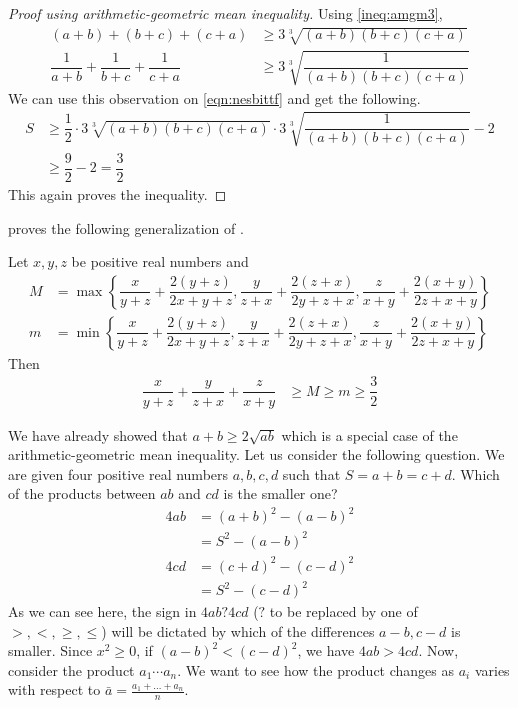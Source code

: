 \documentclass{subfile}
\begin{document}
		\begin{proof}[\itshape Proof using arithmetic-geometric mean inequality]
			Using \ref{ineq:amgm3},
				\begin{align*}
					(a+b)+(b+c)+(c+a)
						& \geq3\sqrt[3]{(a+b)(b+c)(c+a)}\\
					\dfrac{1}{a+b}+\dfrac{1}{b+c}+\dfrac{1}{c+a}
						& \geq3\sqrt[3]{\dfrac{1}{(a+b)(b+c)(c+a)}}
				\end{align*}
			We can use this observation on \ref{eqn:nesbittf} and get the following.
				\begin{align*}
					S
						& \geq\dfrac{1}{2}\cdot3\sqrt[3]{(a+b)(b+c)(c+a)}\cdot3\sqrt[3]{\dfrac{1}{(a+b)(b+c)(c+a)}}-2\\
						& \geq\dfrac{9}{2}-2=\dfrac{3}{2}
				\end{align*}
			This again proves the inequality.
		\end{proof}
	\textcite{anovic_pecaric_2011} proves the following generalization of .
		\begin{theorem}
			Let $x,y,z$ be positive real numbers and
				\begin{align*}
					M
						& = \max\left\{\dfrac{x}{y+z}+\dfrac{2(y+z)}{2x+y+z},\dfrac{y}{z+x}+\dfrac{2(z+x)}{2y+z+x},\dfrac{z}{x+y}+\dfrac{2(x+y)}{2z+x+y}\right\}\\
					m
						& =  \min\left\{\dfrac{x}{y+z}+\dfrac{2(y+z)}{2x+y+z},\dfrac{y}{z+x}+\dfrac{2(z+x)}{2y+z+x},\dfrac{z}{x+y}+\dfrac{2(x+y)}{2z+x+y}\right\}
				\end{align*}
			Then
				\begin{align*}
					\dfrac{x}{y+z}+\dfrac{y}{z+x}+\dfrac{z}{x+y}
						& \geq M\geq m\geq \dfrac{3}{2}
				\end{align*}
		\end{theorem}
	We have already showed that $a+b\geq2\sqrt{ab}$ which is a special case of the arithmetic-geometric mean inequality. Let us consider the following question. We are given four positive real numbers $a,b,c,d$ such that $S=a+b=c+d$. Which of the products between $ab$ and $cd$ is the smaller one?
		\begin{align*}
			4ab
				& = (a+b)^2-(a-b)^2\\
				& = S^2-(a-b)^2\\
			4cd
				& = (c+d)^2-(c-d)^2\\
				& = S^2-(c-d)^2
		\end{align*}
	As we can see here, the sign in $4ab?4cd$ ($?$ to be replaced by one of $>,<,\geq,\leq$) will be dictated by which of the differences $a-b,c-d$ is smaller. Since $x^2\geq0$, if $(a-b)^2<(c-d)^2$, we have $4ab>4cd$. Now, consider the product $a_1\cdots a_n$. We want to see how the product changes as $a_i$ varies with respect to $\bar{a}=\frac{a_1+\ldots+a_n}{n}$.
\end{document}
